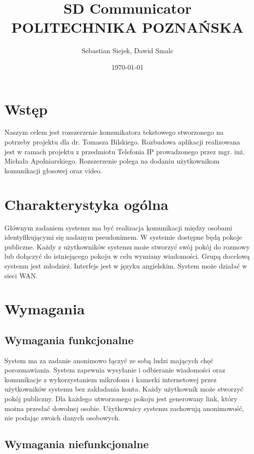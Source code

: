 \documentclass{article}
\title{\textbf{SD Communicator} \\ POLITECHNIKA POZNAŃSKA}
\author{Sebastian Siejek, Dawid Smalc}
\date{\today}
\begin{document}
\maketitle

\tableofcontents{}

\section{Wstęp}

Naszym celem jest rozszerzenie komunikatora tekstowego stworzonego na potrzeby projektu dla dr. Tomasza Bilskiego. Rozbudowa aplikacji realizowana jest w ramach projektu z przedmiotu Telefonia IP prowadzonego przez mgr. inż. Michała Apolniarskiego. Rozszerzenie polega na dodaniu użytkownikom komunikacji głosowej oraz video.

\section{Charakterystyka ogólna}

Głównym zadaniem systemu ma być realizacja komunikacji między osobami identyfikującymi się nadanym pseudonimem. W systemie dostępne będą pokoje publiczne. Każdy z użytkowników systemu może stworzyć swój pokój do rozmowy lub dołączyć do istniejącego pokoju w celu wymiany wiadomości. Grupą docelową systemu jest młodzież. Interfejs jest w języku angielskim. System może działać w sieci WAN.

\section{Wymagania}

\subsection{Wymagania funkcjonalne}

System ma za zadanie anonimowo łączyć ze sobą ludzi mających chęć porozmawiania. System zapewnia wysyłanie i odbieranie wiadomości oraz komunikacje z wykorzystaniem mikrofonu i kamerki internetowej przez użytkowników systemu bez zakładania konta. Każdy użytkownik może stworzyć pokój publiczny. Dla każdego utworzonego pokoju jest generowany link, który można przesłać dowolnej osobie. Użytkownicy systemu zachowują anonimowość, nie podając swoich danych osobowych.

\subsection{Wymagania niefunkcjonalne}
\end{document}
